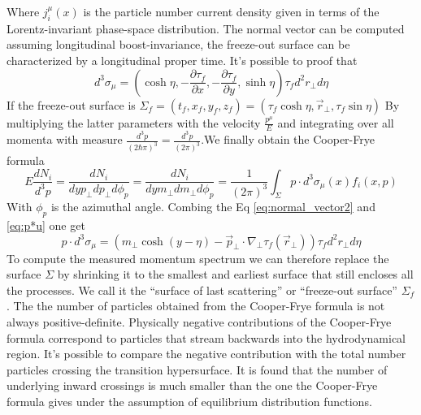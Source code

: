 \documentclass[12pt,a4paper]{book}
\begin{document}
	Where $j_i^\mu(x)$ is the particle number current density given in terms of the Lorentz-invariant phase-space distribution. The normal vector can be computed assuming longitudinal boost-invariance, the freeze-out surface can be characterized by a longitudinal proper time. It's possible to proof that
	\begin{equation}
		d^3 \sigma_\mu=\left(\cosh \eta ,-\frac{\partial \tau_f}{\partial x},-\frac{\partial \tau_f}{\partial y},\sinh\eta \right) \tau_f d^2 r_\perp d\eta
		\label{eq:normal_vector2}
	\end{equation}
	If the freeze-out surface is $\Sigma_f=(t_f,x_f,y_f,z_f)=(\tau_f \cosh \eta, \vec{r}_\perp,\tau_f \sin \eta)$
	 By multiplying the latter parameters with the velocity $\frac{p^\mu}{E}$ and integrating over all momenta with measure $\frac{d^3 p}{(2\hbar\pi)^3}=\frac{d^3 p}{(2\pi)^3}$.We finally obtain the Cooper-Frye formula
	\begin{equation}
		\boxed{
			E \frac{dN_i}{d^3 p}= \frac{dN_i}{dy p_\perp dp_\perp d\phi_p} = \frac{dN_i}{dy m_\perp dm_\perp d\phi_p} = \frac{1}{(2\pi)^3} \int_{\Sigma} p \cdot d^3 \sigma_\mu (x) f_i (x,p) 
		}
		\label{eq:cooper-frye}
	\end{equation}
	With $\phi_p$ is the azimuthal angle. Combing the Eq \ref{eq:normal_vector2} and \ref{eq:p*u} one get
	\begin{equation}
		p \cdot d^3 \sigma_\mu= \left(m_\perp \cosh(y-\eta) -\vec{p}_\perp \cdot \nabla_\perp \tau_f(\vec{r}_\perp) \right) \tau_f d^2 r_\perp d\eta
	\end{equation}
   To compute the measured momentum spectrum we can therefore replace the surface $\Sigma$ by shrinking it to the smallest and earliest surface that still encloses all the processes. We call it the “surface of last scattering” or “freeze-out surface” $\Sigma_f$. The the number of particles obtained from the Cooper-Frye formula is not always positive-definite. Physically negative contributions of the Cooper-Frye formula correspond to particles that stream backwards into the hydrodynamical region. It's possible to compare the negative contribution with the total number particles crossing the transition hypersurface. It is found that the number of underlying inward crossings is much smaller than the one the Cooper-Frye formula gives under the assumption of equilibrium distribution functions. \cite{Cooper-Frye}
	
\end{document}

